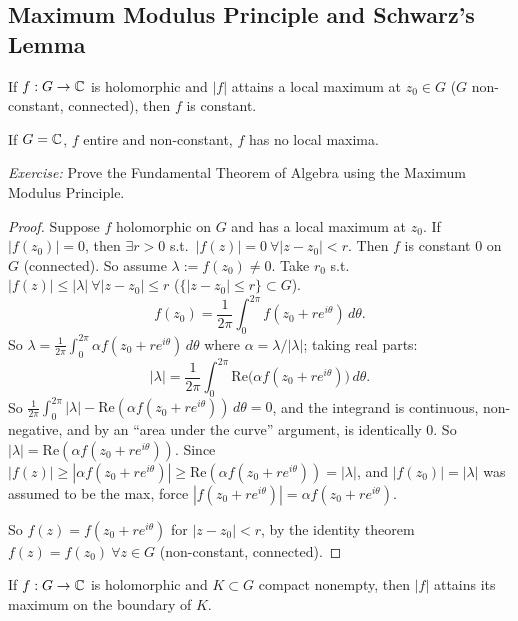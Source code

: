 \documentclass[11pt]{article}
\begin{document}
\subsection{Maximum Modulus Principle and Schwarz's Lemma}

\begin{theorem}
If $f: G \to {\mathbb{C}}$ is holomorphic and $|f|$ attains a local maximum at $z_0 \in G$ ($G$ non-constant, connected), then $f$ is constant.
\end{theorem}

\begin{example}
If $G={\mathbb{C}}$, $f$ entire and non-constant, $f$ has no local maxima.
\end{example}

\emph{Exercise:} Prove the Fundamental Theorem of Algebra using the Maximum Modulus Principle.

\begin{proof}
Suppose $f$ holomorphic on $G$ and has a local maximum at $z_0$.
If $|f(z_0)|=0$, then $\exists r>0$ s.t.\ $|f(z)|=0\ \forall |z-z_0|<r$. Then $f$ is constant $0$ on $G$ (connected).
So assume $\lambda:=f(z_0)\ne0$. Take $r_0$ s.t.\ $|f(z)|\le|\lambda|\ \forall |z-z_0|\le r$ ($\{|z-z_0|\le r\}\subset G$).
\[
f(z_0) = \frac{1}{2\pi}\int_0^{2\pi} f(z_0+re^{i\theta})\,d\theta.
\]
So $\lambda = \frac{1}{2\pi}\int_0^{2\pi} \alpha f(z_0+re^{i\theta})\,d\theta$ where $\alpha=\lambda/|\lambda|$; taking real parts:
\[
|\lambda| = \frac{1}{2\pi}\int_0^{2\pi} \mathrm{Re}\big(\alpha f(z_0+re^{i\theta})\big)\,d\theta.
\]
So $\frac{1}{2\pi}\int_0^{2\pi} |\lambda| - \mathrm{Re}(\alpha f(z_0+re^{i\theta}))\,d\theta = 0$, and the integrand is continuous, non-negative, and by an ``area under the curve'' argument, is identically $0$. So $|\lambda| = \mathrm{Re}(\alpha f(z_0+re^{i\theta}))$. Since $|f(z)| \ge |\alpha f(z_0+re^{i\theta})| \ge \mathrm{Re}(\alpha f(z_0+re^{i\theta})) = |\lambda|$, and $|f(z_0)|=|\lambda|$ was assumed to be the max, force $|f(z_0+re^{i\theta})|=\alpha f(z_0+re^{i\theta})$.

So $f(z) = f(z_0+re^{i\theta})$ for $|z-z_0|<r$, by the identity theorem $f(z) = f(z_0) \ \forall z\in G$ (non-constant, connected).
\end{proof}

\begin{corollary}
If $f: G\to{\mathbb{C}}$ is holomorphic and $K\subset G$ compact nonempty, then $|f|$ attains its maximum on the boundary of $K$.
\end{corollary}
\end{document}
